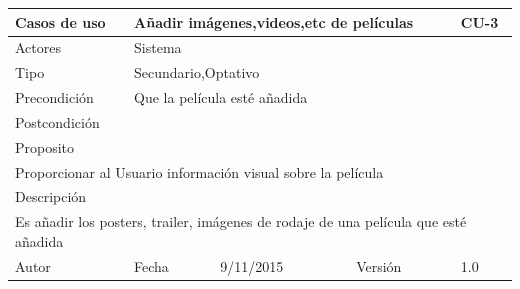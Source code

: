 \documentclass{article}
\begin{document}
\begin{table}[h]
\begin{tabular}{|l|l|l|l|l|l|}
\hline
\multicolumn{2}{|p{2cm}|}{Casos de uso}  & \multicolumn{3}{p{7cm}|}{Añadir imágenes,videos,etc de películas} & CU-3 \\
\hline
\multicolumn{2}{|p{2cm}|}{Actores}       & \multicolumn{4}{p{8cm}|}{Sistema}        \\
\hline
\multicolumn{2}{|p{2cm}|}{Tipo}          & \multicolumn{4}{p{8cm}|}{Secundario,Optativo}        \\
\hline
\multicolumn{2}{|p{2cm}|}{Precondición}  & \multicolumn{4}{p{8cm}|}{Que la película esté añadida}        \\
\hline
\multicolumn{2}{|p{2cm}|}{Postcondición} & \multicolumn{4}{p{8cm}|}{}        \\
\hline
\multicolumn{6}{|p{10cm}|}{Proposito}                                   \\
\hline
\multicolumn{6}{|p{10cm}|}{Proporcionar al Usuario información visual sobre la película }                                            \\
\hline
\multicolumn{6}{|p{10cm}|}{Descripción}                                 \\
\hline
\multicolumn{6}{|p{10cm}|}{Es añadir los posters, trailer, imágenes de rodaje de una película que esté añadida}                                            \\
\hline
Autor              &              & Fecha   & 9/11/2015     &   Versión  &1.0\\
\hline
\end{tabular}
\end{table}

\clearpage
\end{document}

